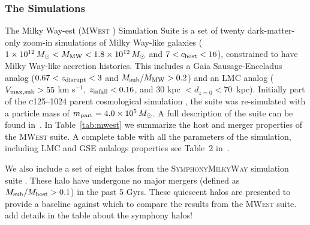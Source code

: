 \documentclass[twocolumn, linenumbers]{openjournal}
\newcommand{\mwest}{\textsc{MWest }}
\newcommand{\symphony}{\textsc{SymphonyMilkyWay }}
\begin{document}
\subsubsection{The Simulations}\label{sec:simulations}
The Milky Way-est (\mwest) Simulation Suite is a set of twenty dark-matter-only zoom-in 
simulations of Milky Way-like galaxies ($1 \times 10^{12}\, M_\odot < M_{\rm MW} < 1.8 \times 10^{12}\, M_\odot$ 
and $7 < c_{\rm host} < 16$), constrained to have Milky Way-like accretion histories. This 
includes a Gaia Sausage-Enceladus analog ($0.67 < z_{\rm disrupt} < 3$ and $M_{\rm sub}/M_{\rm MW} > 0.2$) 
and an LMC analog ($V_{\rm \max,sub} > 55$ km s$^{-1}$, $z_{\rm infall} < 0.16$, and $30$ kpc $< d_{z=0} < 70$~kpc). 
Initially part of the \textsc{c125--1024} parent cosmological simulation \citep{Mao2015}, the suite was re-simulated with a 
particle mass of $m_{\rm part} = 4.0 \times 10^5\, M_\odot$. A full description of the suite can be found 
in~\cite{buch2024milky}. In Table~\ref{tab:mwest} we summarize the host and merger 
properties of the \mwest suite. A complete table with all the parameters of the 
simulation, including LMC and GSE anlalogs properties see Table~2 in~\cite{buch2024milky}.


We also include a set of eight halos from the \symphony simulation suite \citep{Nadler_2023}.
These halo have undergone no major mergers (defined as $M_{\rm sub}/M_{\rm host} > 0.1$) 
in the past 5 Gyrs. These quiescent halos are presented to provide a baseline against 
which to compare the results from the \mwest suite. {\color{Coral3} add details in the 
table about the symphony halos!}
\end{document}
